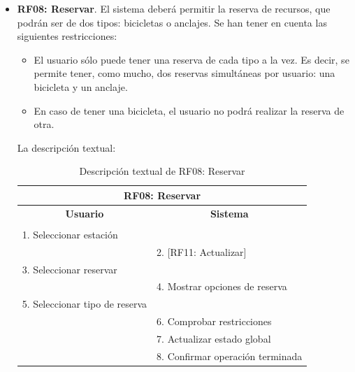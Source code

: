 \begin{itemize}
	\FloatBarrier
	\item \textbf{RF08: Reservar}. El sistema deberá permitir la reserva de recursos, que podrán ser de dos tipos: bicicletas o anclajes. Se han tener en cuenta las siguientes restricciones:
	\begin{itemize}
		\item El usuario sólo puede tener una reserva de cada tipo a la vez. Es decir, se permite tener, como mucho, dos reservas simultáneas por usuario: una bicicleta y un anclaje.
		\item En caso de tener una bicicleta, el usuario no podrá realizar la reserva de otra.
	\end{itemize}
	
	La descripción textual:
	\begin{table}[h]
		\centering	
		\begin{tabular}{|l|l|}
			\hline
			\multicolumn{2}{|c|}{\textbf{RF08: Reservar}} \\ \hline
			\multicolumn{1}{|c|}{\textbf{Usuario}} & \multicolumn{1}{c|}{\textbf{Sistema}} \\ \hline
			[Pto. inclusión: RF02: Loguear usuario] &\\ \hline
			1. Seleccionar estación &\\ \hline
			& 2. [RF11: Actualizar] \\ \hline
			3. Seleccionar reservar &\\ \hline
			& 4. Mostrar opciones de reserva \\ \hline
			5. Seleccionar tipo de reserva &\\ \hline
			& 6. Comprobar restricciones \\ \hline
			& 7. Actualizar estado global \\ \hline
			& 8. Confirmar operación terminada \\ \hline 
		\end{tabular}
		\caption{Descripción textual de RF08: Reservar}
		\label{tab:tablaDescTextualRF08}
	\end{table}
	

\end{itemize}
